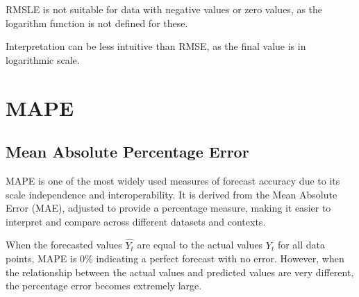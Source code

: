 {
    \item RMSLE is not suitable for data with negative values or zero values, as the logarithm function is not defined for these.
    \item Interpretation can be less intuitive than RMSE, as the final value is in logarithmic scale.
}

\clearpage
\thispagestyle{regressionstyle}
\section{MAPE}
\subsection{Mean Absolute Percentage Error}

MAPE is one of the most widely used measures of forecast accuracy due to its scale independence and interoperability.
It is derived from the Mean Absolute Error (MAE), adjusted to provide a percentage measure, making it easier to interpret and compare across different datasets and contexts.

\begin{center}
\end{center}

When the forecasted values $\hat{Y_{t}}$ are equal to the actual values $Y_{t}$ for all data points, MAPE is 0\% indicating a perfect forecast with no error.
However, when the relationship between the actual values and predicted values are very different, the percentage error becomes extremely large.

